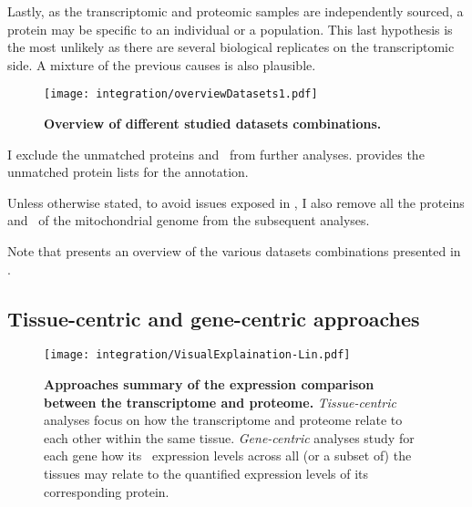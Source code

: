 Lastly, as the transcriptomic and proteomic samples are independently sourced,
a protein may be specific to an individual or a population.
This last hypothesis is the most unlikely
as there are several biological replicates on the transcriptomic side.
A mixture of the previous causes is also plausible.\mybr\

\begin{figure}[!htbp]
     \texttt{[image: integration/overviewDatasets1.pdf]}\centering
     \vspace{-3mm}
     \caption[Overview of different datasets combination]{%
     \label{fig:setsOverview}\textbf{Overview of different studied datasets
     combinations.}}
\end{figure}

I exclude the unmatched proteins and \mRNAs\ from further analyses.
 provides the unmatched protein lists
for the  annotation.\mybr\

Unless otherwise stated, to avoid issues exposed in ,
I also remove all the proteins and \mRNAs\ of the mitochondrial genome
from the subsequent analyses.\mybr\

Note that  presents
an overview of the various datasets combinations presented
in .\mybr\

\subsection{Tissue-centric and gene-centric approaches}

\begin{figure}[!htpb]
    \texttt{[image: integration/VisualExplaination-Lin.pdf]}\centering
    \caption[Summary of the expression comparison approaches between
    the transcriptome and proteome]{\label{fig:visualexp}\textbf{Approaches
    summary of the expression comparison between the transcriptome and proteome.}
    \emph{Tissue-centric} analyses focus on
    how the transcriptome and proteome relate to each other within the same tissue.
    \emph{Gene-centric} analyses study for each gene how its \mRNA\ expression
    levels across all (or a subset of) the tissues may relate to
    the quantified expression levels of its corresponding protein.
    }
\end{figure}

